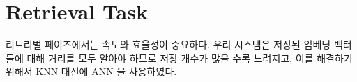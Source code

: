 \section{Retrieval Task}
리트리벌 페이즈에서는 속도와 효율성이 중요하다. 우리 시스템은 저장된 임베딩 벡터들에 대해 거리를 모두 알아야 하므로 저장 개수가 많을 수록 느려지고, 이를 해결하기 위해서 KNN 대신에 ANN 을 사용하였다.  
